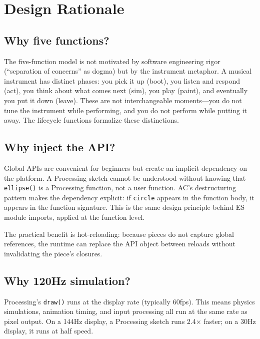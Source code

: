 \documentclass[10pt,letterpaper,twocolumn]{article}
\begin{document}

\section{Design Rationale}
\label{sec:rationale}

\subsection{Why five functions?}

The five-function model is not motivated by software engineering rigor (``separation of concerns'' as dogma) but by the instrument metaphor. A musical instrument has distinct phases: you pick it up (boot), you listen and respond (act), you think about what comes next (sim), you play (paint), and eventually you put it down (leave). These are not interchangeable moments---you do not tune the instrument while performing, and you do not perform while putting it away. The lifecycle functions formalize these distinctions.

\subsection{Why inject the API?}

Global APIs are convenient for beginners but create an implicit dependency on the platform. A Processing sketch cannot be understood without knowing that \texttt{ellipse()} is a Processing function, not a user function. AC's destructuring pattern makes the dependency explicit: if \texttt{circle} appears in the function body, it appears in the function signature. This is the same design principle behind ES module imports, applied at the function level.

The practical benefit is hot-reloading: because pieces do not capture global references, the runtime can replace the API object between reloads without invalidating the piece's closures.

\subsection{Why 120Hz simulation?}

Processing's \texttt{draw()} runs at the display rate (typically 60fps). This means physics simulations, animation timing, and input processing all run at the same rate as pixel output. On a 144Hz display, a Processing sketch runs 2.4$\times$ faster; on a 30Hz display, it runs at half speed.
\end{document}
